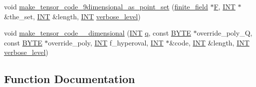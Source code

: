 \begin{DoxyCompactItemize}
\item 
void \mbox{\hyperlink{tensor_8_c_aaf423a41c900e47945414385a1f90511}{make\+\_\+tensor\+\_\+code\+\_\+9dimensional\+\_\+as\+\_\+point\+\_\+set}} (\mbox{\hyperlink{classfinite__field}{finite\+\_\+field}} $\ast$\mbox{\hyperlink{simeon_8_c_a21a61c535ff7d9d4b674461d3b19fffa}{F}}, \mbox{\hyperlink{galois_8h_a09fddde158a3a20bd2dcadb609de11dc}{I\+NT}} $\ast$\&the\+\_\+set, \mbox{\hyperlink{galois_8h_a09fddde158a3a20bd2dcadb609de11dc}{I\+NT}} \&length, \mbox{\hyperlink{galois_8h_a09fddde158a3a20bd2dcadb609de11dc}{I\+NT}} \mbox{\hyperlink{simeon_8_c_a818073fbcc2f439e7c56952f67386122}{verbose\+\_\+level}})
\item 
void \mbox{\hyperlink{tensor_8_c_ac1f62adbb468b75ca66a5e9f8c6c9b1b}{make\+\_\+tensor\+\_\+code\+\_\+\_\+dimensional}} (\mbox{\hyperlink{galois_8h_a09fddde158a3a20bd2dcadb609de11dc}{I\+NT}} \mbox{\hyperlink{simeon_8_c_a92cbb483a3b27ae1a0dbfcb125ce216f}{q}}, const \mbox{\hyperlink{galois_8h_ab6cc7b4aeb6ea31aba2b3fbfc83ff5e6}{B\+Y\+TE}} $\ast$override\+\_\+poly\+\_\+Q, const \mbox{\hyperlink{galois_8h_ab6cc7b4aeb6ea31aba2b3fbfc83ff5e6}{B\+Y\+TE}} $\ast$override\+\_\+poly, \mbox{\hyperlink{galois_8h_a09fddde158a3a20bd2dcadb609de11dc}{I\+NT}} f\+\_\+hyperoval, \mbox{\hyperlink{galois_8h_a09fddde158a3a20bd2dcadb609de11dc}{I\+NT}} $\ast$\&code, \mbox{\hyperlink{galois_8h_a09fddde158a3a20bd2dcadb609de11dc}{I\+NT}} \&length, \mbox{\hyperlink{galois_8h_a09fddde158a3a20bd2dcadb609de11dc}{I\+NT}} \mbox{\hyperlink{simeon_8_c_a818073fbcc2f439e7c56952f67386122}{verbose\+\_\+level}})
\end{DoxyCompactItemize}


\subsection{Function Documentation}
\mbox{\label{tensor_8_c_ab435d16ae5ea65936c1d10cb7a51ff24}} 
